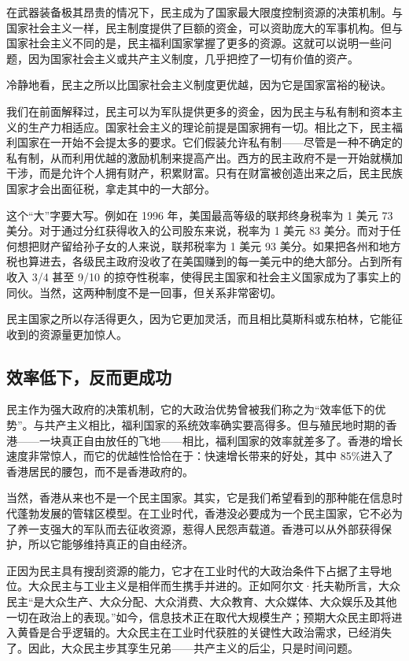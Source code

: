 在武器装备极其昂贵的情况下，民主成为了国家最大限度控制资源的决策机制。与国家社会主义一样，民主制度提供了巨额的资金，可以资助庞大的军事机构。但与国家社会主义不同的是，民主福利国家掌握了更多的资源。这就可以说明一些问题，因为国家社会主义或共产主义制度，几乎把控了一切有价值的资产。

冷静地看，民主之所以比国家社会主义制度更优越，因为它是国家富裕的秘诀。

我们在前面解释过，民主可以为军队提供更多的资金，因为民主与私有制和资本主义的生产力相适应。国家社会主义的理论前提是国家拥有一切。相比之下，民主福利国家在一开始不会提太多的要求。它们假装允许私有制——尽管是一种不确定的私有制，从而利用优越的激励机制来提高产出。西方的民主政府不是一开始就横加干涉，而是允许个人拥有财产，积累财富。只有在财富被创造出来之后，民主民族国家才会出面征税，拿走其中的一大部分。

这个“大”字要大写。例如在 1996 年，美国最高等级的联邦终身税率为 1 美元 73 美分。对于通过分红获得收入的公司股东来说，税率为 1 美元 83 美分。而对于任何想把财产留给孙子女的人来说，联邦税率为 1 美元 93 美分。如果把各州和地方税也算进去，各级民主政府没收了在美国赚到的每一美元中的绝大部分。占到所有收入 3/4 甚至 9/10 的掠夺性税率，使得民主国家和社会主义国家成为了事实上的同伙。当然，这两种制度不是一回事，但关系非常密切。

民主国家之所以存活得更久，因为它更加灵活，而且相比莫斯科或东柏林，它能征收到的资源量更加惊人。

\subsection{效率低下，反而更成功}
民主作为强大政府的决策机制，它的大政治优势曾被我们称之为“效率低下的优势”。与共产主义相比，福利国家的系统效率确实要高得多。但与殖民地时期的香港——一块真正自由放任的飞地——相比，福利国家的效率就差多了。香港的增长速度非常惊人，而它的优越性恰恰在于：快速增长带来的好处，其中 85\%进入了香港居民的腰包，而不是香港政府的。

当然，香港从来也不是一个民主国家。其实，它是我们希望看到的那种能在信息时代蓬勃发展的管辖区模型。在工业时代，香港没必要成为一个民主国家，它不必为了养一支强大的军队而去征收资源，惹得人民怨声载道。香港可以从外部获得保护，所以它能够维持真正的自由经济。

正因为民主具有搜刮资源的能力，它才在工业时代的大政治条件下占据了主导地位。大众民主与工业主义是相伴而生携手并进的。正如阿尔文·托夫勒所言，大众民主“是大众生产、大众分配、大众消费、大众教育、大众媒体、大众娱乐及其他一切在政治上的表现。”如今，信息技术正在取代大规模生产；预期大众民主即将进入黄昏是合乎逻辑的。大众民主在工业时代获胜的关键性大政治需求，已经消失了。因此，大众民主步其孪生兄弟——共产主义的后尘，只是时间问题。

